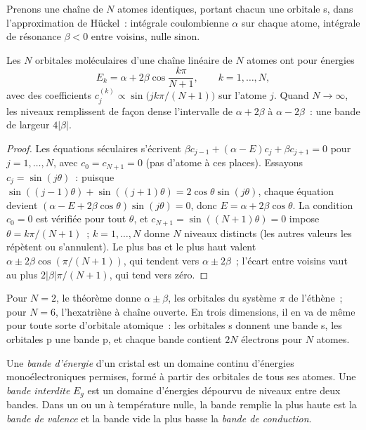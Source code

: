 Prenons une chaîne de $N$ atomes identiques, portant chacun une orbitale s,
dans l'approximation de Hückel~: intégrale coulombienne $\alpha$ sur chaque atome, intégrale de résonance $\beta < 0$
entre voisins, nulle sinon.

\begin{theorem}\label{thm:b3:solid-state:chain}
Les $N$ orbitales moléculaires d'une chaîne linéaire de $N$ atomes ont pour
énergies
\[
  E_k = \alpha + 2\beta\cos\frac{k\pi}{N + 1}, \qquad k = 1, \dots, N,
\]
avec des coefficients $c_j^{(k)} \propto \sin\bigl(jk\pi/(N + 1)\bigr)$ sur l'atome $j$. Quand $N \to \infty$, les niveaux
remplissent de façon dense l'intervalle de $\alpha + 2\beta$ à $\alpha - 2\beta$~: une bande de largeur $4|\beta|$.
\end{theorem}

\begin{proof}
Les équations séculaires s'écrivent $\beta c_{j-1} + (\alpha - E)c_j + \beta c_{j+1} = 0$ pour $j = 1, \dots, N$, avec $c_0 = c_{N+1} = 0$
(pas d'atome à ces places). Essayons $c_j = \sin(j\theta)$~: puisque $\sin((j - 1)\theta) + \sin((j + 1)\theta) = 2\cos\theta\sin(j\theta)$, chaque
équation devient $(\alpha - E + 2\beta\cos\theta)\sin(j\theta) = 0$, donc $E = \alpha + 2\beta\cos\theta$. La condition $c_0 = 0$ est vérifiée
pour tout $\theta$, et $c_{N+1} = \sin((N + 1)\theta) = 0$ impose $\theta = k\pi/(N + 1)$~; $k = 1, \dots, N$ donne $N$ niveaux
distincts (les autres valeurs les répètent ou s'annulent). Le plus bas et le
plus haut valent
$\alpha \pm 2\beta\cos(\pi/(N + 1))$, qui tendent vers $\alpha \pm 2\beta$~; l'écart entre voisins vaut au plus
$2|\beta|\pi/(N + 1)$, qui tend vers zéro.
\end{proof}

Pour $N = 2$, le théorème donne $\alpha \pm \beta$, les orbitales du système $\pi$ de l'éthène~; pour
$N = 6$, l'hexatriène à chaîne ouverte. En trois dimensions, il en va de même
pour toute sorte d'orbitale atomique~: les orbitales s donnent une bande s,
les orbitales p une bande p, et chaque bande contient $2N$ électrons pour
$N$ atomes.

\begin{definition}[Bandes]\label{def:b3:solid-state:band}
Une \emph{bande d'énergie} d'un cristal est un domaine
continu d'énergies monoélectroniques permises, formé à partir des orbitales
de tous ses atomes. Une \emph{bande interdite} $E_g$ est un domaine d'énergies
dépourvu de niveaux entre deux bandes. Dans un  ou un 
à température nulle, la bande remplie la plus haute est la \emph{bande de valence}
et la bande vide la plus basse la \emph{bande de conduction}.
\end{definition}

